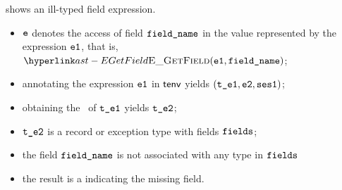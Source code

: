 \FormallyParagraph
\begin{mathpar}
\end{mathpar}


 shows an ill-typed field expression.

\ProseParagraph
\AllApply
\begin{itemize}
  \item $\ve$ denotes the access of field $\fieldname$ in the value represented by the expression $\veone$, that is, $\EGetField(\veone, \fieldname)$;
  \item annotating the expression $\veone$ in $\tenv$ yields $(\vteone, \vetwo, \vsesone)$\ProseOrTypeError;
  \item obtaining the \underlyingtype\ of $\vteone$ yields $\vtetwo$\ProseOrTypeError;
  \item $\vtetwo$ is a record or exception type with fields $\fields$;
  \item the field $\fieldname$ is not associated with any type in $\fields$
  \item the result is a \typingerrorterm{} indicating the missing field.
\end{itemize}

\FormallyParagraph
\begin{mathpar}
\end{mathpar}

